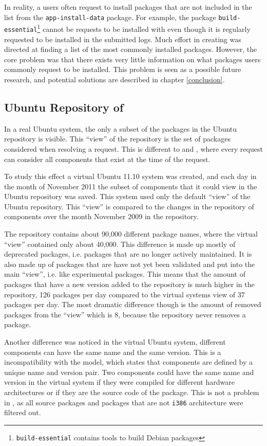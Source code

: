 In reality, a users often request to install packages that are not included in the list from the \texttt{app-install-data} package. 
For example, the package \texttt{build-essential}\footnote{\texttt{build-essential} contains tools to build Debian packages}
cannot be requests to be installed with \usermodel even though it is regularly requested to be installed in the submitted logs.
Much effort in creating \usermodel was directed at finding a list of the most commonly installed packages.
However, the core problem was that there exists very little information on what packages users commonly request to be installed.
This problem is seen as a possible future research, and potential solutions are described in chapter \ref{conclusion}. 

\subsection{Ubuntu Repository of \usermodel}
In a real Ubuntu system, the only a subset of the packages in the Ubuntu repository is visible.
This ``view'' of the repository is the set of packages considered when resolving a request.
This is different to \modelname and \usermodel, 
where every request can consider all components that exist at the time of the request. 

To study this effect a virtual Ubuntu 11.10 system was created, 
and each day in the month of November 2011 the subset of components that it could view in the Ubuntu repository was saved.
This system used only the default ``view'' of the Ubuntu repository.
This ``view'' is compared to the changes in the repository of components over the month November 2009 in the \usermodel repository.

The \usermodel repository contains about 90,000 different package names, where the virtual ``view'' contained only about 40,000.
This difference is made up mostly of deprecated packages, i.e. packages that are no longer actively maintained.
It is also made up of packages that are have not yet been validated and put into the main ``view'', i.e. like experimental packages. 
This means that the amount of packages that have a new version added to the repository is much higher in the \usermodel repository,
126 packages per day compared to the virtual systems view of 37 packages per day.
The most dramatic difference though is the amount of removed packages from the ``view'' which is 8, because the \usermodel repository never removes a package. 

Another difference was noticed in the virtual Ubuntu system, different components can have the same name and the same version.
This is a incompatibility with the \modelname model, which states that components are defined by a unique name and version pair.
Two components could have the same name and version in the virtual system 
if they were compiled for different hardware architectures or if they are the source code of the package.
This is not a problem in \usermodel, as all source packages and packages that are not \texttt{i386} architecture were filtered out.

